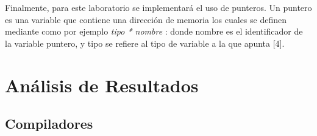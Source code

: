 \documentclass[12pt,a4paper]{article}
\begin{document}
Finalmente, para este laboratorio se implementará el uso de punteros. Un puntero es una variable que contiene una dirección de memoria los cuales se definen mediante como por ejemplo \textit{tipo * nombre} : donde nombre es el identificador de la variable puntero, y tipo se refiere al tipo de variable a la que apunta [4].




\section{Análisis de Resultados}

\subsection{Compiladores}
\end{document}
